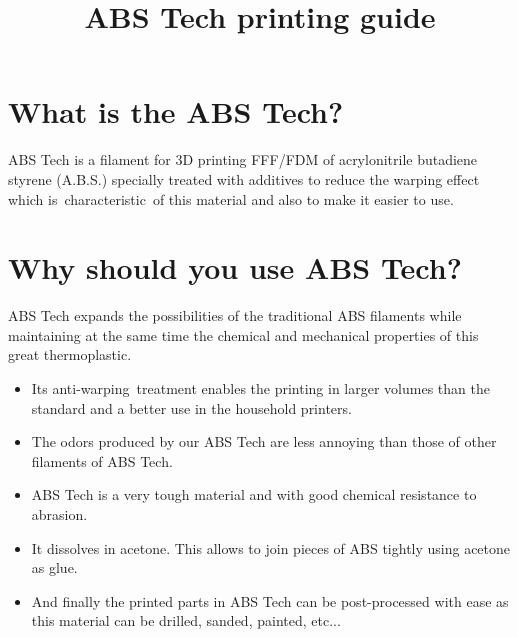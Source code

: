 \documentclass[11pt,a4paper]{article}
\title{ABS Tech printing guide}
\date{}
\begin{document}

\section{What is the ABS Tech?}ABS Tech is a filament for 3D printing FFF/FDM of acrylonitrile butadiene styrene (A.B.S.) specially treated with additives to reduce the warping effect which is characteristic of this material and also to make it easier to use.
\section{Why should you use ABS Tech?}
ABS Tech expands the possibilities of the traditional ABS filaments while maintaining at the same time the chemical and mechanical properties of this great thermoplastic.
\begin{itemize}
\item Its anti-warping treatment enables the printing in larger volumes than the standard and a better use in the household printers.
\item The odors produced by our ABS Tech are less annoying than those of other filaments of ABS Tech.
\item ABS Tech is a very tough material and with good chemical resistance to abrasion.
\item It dissolves in acetone. This allows to join pieces of ABS tightly using acetone as glue.
\item And finally the printed parts in ABS Tech can be post-processed with ease as this material can be drilled, sanded, painted, etc...
\end{itemize}
\end{document}
